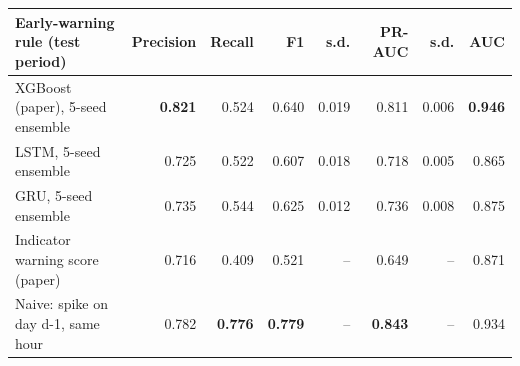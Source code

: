 \begin{tabular}{lrrrrrrr}
\toprule
Early-warning rule (test period) & Precision & Recall & F1 & s.d. & PR-AUC & s.d. & AUC \\
\midrule
XGBoost (paper), 5-seed ensemble & \textbf{0.821} & 0.524 & 0.640 & 0.019 & 0.811 & 0.006 & \textbf{0.946} \\
LSTM, 5-seed ensemble & 0.725 & 0.522 & 0.607 & 0.018 & 0.718 & 0.005 & 0.865 \\
GRU, 5-seed ensemble & 0.735 & 0.544 & 0.625 & 0.012 & 0.736 & 0.008 & 0.875 \\
Indicator warning score (paper) & 0.716 & 0.409 & 0.521 & -- & 0.649 & -- & 0.871 \\
Naive: spike on day d-1, same hour & 0.782 & \textbf{0.776} & \textbf{0.779} & -- & \textbf{0.843} & -- & 0.934 \\
\bottomrule
\end{tabular}
